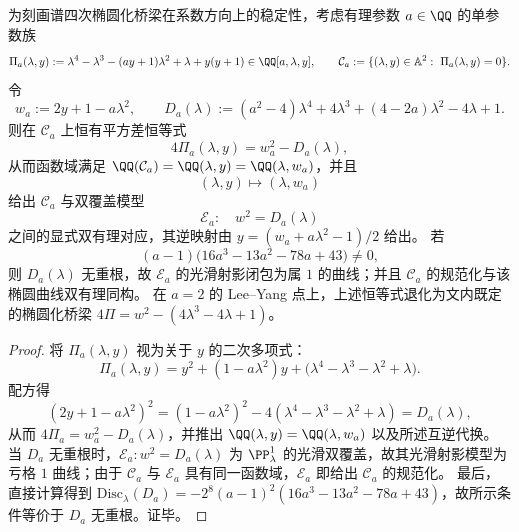 \begin{conclusion}\label{con:xi-terminal-zm-leyang-spectral-quartic-a-elliptification}
为刻画谱四次椭圆化桥梁在系数方向上的稳定性，考虑有理参数 \(a\in\QQ\) 的单参数族
\[
\Pi_a(\lambda,y):=\lambda^4-\lambda^3-(ay+1)\lambda^2+\lambda+y(y+1)\in\QQ[a,\lambda,y],
\qquad
\mathcal C_a:=\{(\lambda,y)\in\mathbb A^2:\ \Pi_a(\lambda,y)=0\}.
\]
令
\[
w_a:=2y+1-a\lambda^2,
\qquad
D_a(\lambda):=(a^2-4)\lambda^4+4\lambda^3+(4-2a)\lambda^2-4\lambda+1.
\]
则在 \(\mathcal C_a\) 上恒有平方差恒等式
\[
4\Pi_a(\lambda,y)=w_a^2-D_a(\lambda),
\]
从而函数域满足
\(
\QQ(\mathcal C_a)=\QQ(\lambda,y)=\QQ(\lambda,w_a)
\)，并且
\[
(\lambda,y)\longmapsto(\lambda,w_a)
\]
给出 \(\mathcal C_a\) 与双覆盖模型
\[
\mathcal E_a:\quad w^2=D_a(\lambda)
\]
之间的显式双有理对应，其逆映射由
\(
y=(w_a+a\lambda^2-1)/2
\)
给出。
若
\[
(a-1)\bigl(16a^3-13a^2-78a+43\bigr)\neq 0,
\]
则 \(D_a(\lambda)\) 无重根，故 \(\mathcal E_a\) 的光滑射影闭包为属 \(1\) 的曲线；并且 \(\mathcal C_a\) 的规范化与该椭圆曲线双有理同构。
在 \(a=2\) 的 Lee--Yang 点上，上述恒等式退化为文内既定的椭圆化桥梁
\(
4\Pi=w^2-(4\lambda^3-4\lambda+1)
\)。
\end{conclusion}
\begin{proof}
将 \(\Pi_a(\lambda,y)\) 视为关于 \(y\) 的二次多项式：
\[
\Pi_a(\lambda,y)=y^2+(1-a\lambda^2)y+\bigl(\lambda^4-\lambda^3-\lambda^2+\lambda\bigr).
\]
配方得
\[
(2y+1-a\lambda^2)^2=(1-a\lambda^2)^2-4(\lambda^4-\lambda^3-\lambda^2+\lambda)=D_a(\lambda),
\]
从而 \(4\Pi_a=w_a^2-D_a(\lambda)\)，并推出 \(\QQ(\lambda,y)=\QQ(\lambda,w_a)\) 以及所述互逆代换。
当 \(D_a\) 无重根时，\(\mathcal E_a:w^2=D_a(\lambda)\) 为 \(\PP^1_\lambda\) 的光滑双覆盖，故其光滑射影模型为亏格 \(1\) 曲线；由于 \(\mathcal C_a\) 与 \(\mathcal E_a\) 具有同一函数域，\(\mathcal E_a\) 即给出 \(\mathcal C_a\) 的规范化。
最后，直接计算得到
\(
\mathrm{Disc}_{\lambda}(D_a)=-2^8(a-1)^2(16a^3-13a^2-78a+43)
\)，故所示条件等价于 \(D_a\) 无重根。证毕。
\end{proof}

